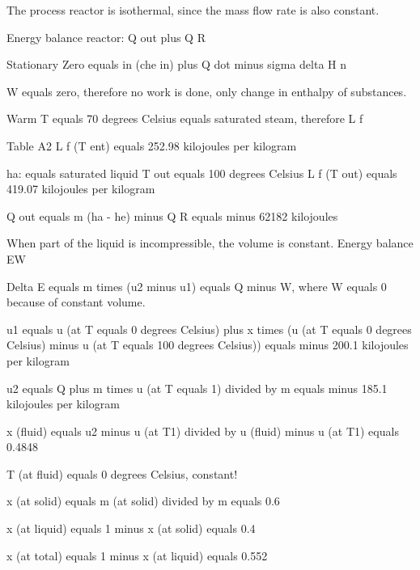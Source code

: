 The process reactor is isothermal, since the mass flow rate is also constant.

Energy balance reactor:
Q out plus Q R

Stationary
Zero equals in (che in) plus Q dot minus sigma delta H n

W equals zero, therefore no work is done, only change in enthalpy of substances.

Warm T equals 70 degrees Celsius equals saturated steam, therefore L f

Table A2 L f (T ent) equals 252.98 kilojoules per kilogram

ha: equals saturated liquid T out equals 100 degrees Celsius L f (T out) equals 419.07 kilojoules per kilogram

Q out equals m (ha - he) minus Q R equals minus 62182 kilojoules

When part of the liquid is incompressible, the volume is constant.  
Energy balance EW

Delta E equals m times (u2 minus u1) equals Q minus W, where W equals 0 because of constant volume.

u1 equals u (at T equals 0 degrees Celsius) plus x times (u (at T equals 0 degrees Celsius) minus u (at T equals 100 degrees Celsius))
equals minus 200.1 kilojoules per kilogram

u2 equals Q plus m times u (at T equals 1) divided by m
equals minus 185.1 kilojoules per kilogram

x (fluid) equals u2 minus u (at T1) divided by u (fluid) minus u (at T1)
equals 0.4848

T (at fluid) equals 0 degrees Celsius, constant!

x (at solid) equals m (at solid) divided by m equals 0.6

x (at liquid) equals 1 minus x (at solid) equals 0.4

x (at total) equals 1 minus x (at liquid) equals 0.552